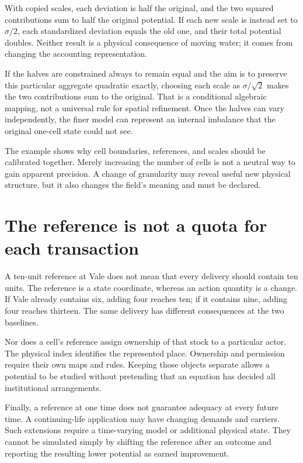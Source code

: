 With copied scales, each deviation is half the original, and the two squared contributions sum to half the original potential. If each new scale is instead set to \(\sigma/2\), each standardized deviation equals the old one, and their total potential doubles. Neither result is a physical consequence of moving water; it comes from changing the accounting representation.

If the halves are constrained always to remain equal and the aim is to preserve this particular aggregate quadratic exactly, choosing each scale as \(\sigma/\sqrt{2}\) makes the two contributions sum to the original. That is a conditional algebraic mapping, not a universal rule for spatial refinement. Once the halves can vary independently, the finer model can represent an internal imbalance that the original one-cell state could not see.

The example shows why cell boundaries, references, and scales should be calibrated together. Merely increasing the number of cells is not a neutral way to gain apparent precision. A change of granularity may reveal useful new physical structure, but it also changes the field's meaning and must be declared.

\section{The reference is not a quota for each transaction}
A ten-unit reference at Vale does not mean that every delivery should contain ten units. The reference is a state coordinate, whereas an action quantity is a change. If Vale already contains six, adding four reaches ten; if it contains nine, adding four reaches thirteen. The same delivery has different consequences at the two baselines.

Nor does a cell's reference assign ownership of that stock to a particular actor. The physical index identifies the represented place. Ownership and permission require their own maps and rules. Keeping those objects separate allows a potential to be studied without pretending that an equation has decided all institutional arrangements.

Finally, a reference at one time does not guarantee adequacy at every future time. A continuing-life application may have changing demands and carriers. Such extensions require a time-varying model or additional physical state. They cannot be simulated simply by shifting the reference after an outcome and reporting the resulting lower potential as earned improvement.

